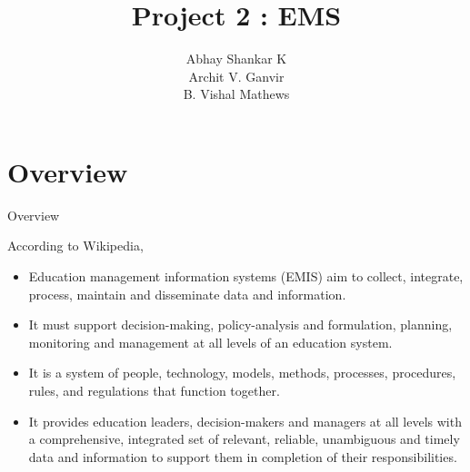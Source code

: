 \documentclass{beamer}
\DeclareMathOperator*{\pipe}{|}
\begin{document}
\newcommand{\bfr}[2]{\section{#1} \begin{frame}{#1} #2 \end{frame}}

	\title{Project 2 : EMS}
		\author{ Abhay Shankar K \\ Archit V. Ganvir \\ B. Vishal Mathews}

	\begin{frame}
    		\titlepage 
	\end{frame}
	
	\begin{frame}
		\tableofcontents
	\end{frame}


	\providecommand{\brak}[1]{\ensuremath{\left(#1\right)}}
	\providecommand{\sbrak}[1]{\ensuremath{\left[#1\right]}}
	\providecommand{\cbrak}[1]{\ensuremath{\left\{#1\right\}}}
	\newcommand{\req}{\noindent \textbf{Required: }}
	\providecommand{\rpr}[2]{\ensuremath{P_{#1}\left(#2\right)}} %
	\providecommand{\spr}[1]{\ensuremath{P\left(#1\right)}} %
	\providecommand{\cpr}[2]{\ensuremath{\spr{#1 \pipe #2}}} %

	\bfr{Overview}{
	
		According to Wikipedia,
		\begin{itemize}
			\item Education management information systems (EMIS) aim to collect, integrate, process, maintain and disseminate data and information.
			\item It must support decision-making, policy-analysis and formulation, planning, monitoring and management at all levels of an education system. 
			\item It is a system of people, technology, models, methods, processes, procedures, rules, and regulations that function together.
			\item It provides education leaders, decision-makers and managers at all levels with a comprehensive, integrated set of relevant, reliable, unambiguous and timely data and information to support them in completion of their responsibilities.
		\end{itemize}
		}	
	
\end{document}
